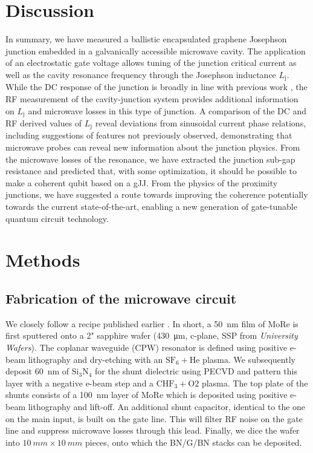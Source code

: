\documentclass[preprint,
  onecolumn,
  notitlepage,
  amsmath,amssymb,
  aip,
  apl,
]{revtex4-1}
\begin{document}
\section{Discussion}

In summary, we have measured a ballistic encapsulated graphene Josephson junction embedded in a galvanically accessible microwave cavity.
The application of an electrostatic gate voltage allows tuning of the junction critical current as well as the cavity resonance frequency through the Josephson inductance $L_\textrm{j}$.
While the DC response of the junction is broadly in line with previous work \cite{calado_ballistic_2015a,benshalom_quantum_2015,lee_ultimately_2015}, the RF measurement of the cavity-junction system provides additional information on $L_\textrm{j}$ and microwave losses in this type of junction.
A comparison of the DC and RF derived values of $L_\textrm{j}$ reveal deviations from sinusoidal current phase relations, including suggestions of features not previously observed, demonstrating that microwave probes can reveal new information about the junction physics. 
From the microwave losses of the resonance, we have extracted the junction sub-gap resistance and predicted that, with some optimization, it should be possible to make a coherent qubit based on a gJJ.
From the physics of the proximity junctions, we have suggested a route towards improving the coherence potentially towards the current state-of-the-art, enabling a new generation of gate-tunable quantum circuit technology. 


\section*{Methods}
\subsection*{Fabrication of the microwave circuit}
We closely follow a recipe published earlier \cite{bosman_broadband_2015,singh_molybdenumrhenium_2014}.
In short, a \SI{50}{nm} film of MoRe is first sputtered onto a 2" sapphire wafer (\SI{430}{\micro m}, c-plane, SSP from \textit{University Wafers}).
The coplanar waveguide (CPW) resonator is defined using positive e-beam lithography and dry-etching with an $\mathrm{SF_6 + He}$ plasma.
We subsequently deposit \SI{60}{nm} of $\mathrm{Si_3N_4}$ for the shunt dielectric using PECVD and pattern this layer with a negative e-beam step and a $\mathrm{CHF_3 + O2}$ plasma.
The top plate of the shunts consists of a \SI{100}{nm} layer of MoRe which is deposited using positive e-beam lithography and lift-off.
An additional shunt capacitor, identical to the one on the main input, is built on the gate line.
This will filter RF noise on the gate line and suppress microwave losses through this lead.
Finally, we dice the wafer into $\SI{10}{mm}\times\SI{10}{mm}$ pieces, onto which the BN/G/BN stacks can be deposited.
\end{document}
